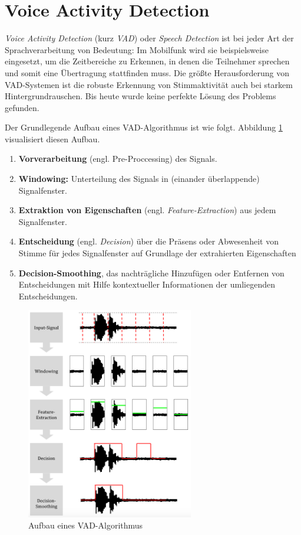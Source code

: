 \section{Voice Activity Detection}
\label{sec:vad_new}

\emph{Voice Activity Detection} (kurz \emph{VAD}) oder \emph{Speech Detection} ist bei jeder Art der Sprachverarbeitung von Bedeutung: Im Mobilfunk wird sie beispielsweise eingesetzt, um die Zeitbereiche zu Erkennen, in denen die Teilnehmer sprechen und somit eine Übertragung stattfinden muss. Die größte Herausforderung von VAD-Systemen ist die robuste Erkennung von Stimmaktivität auch bei starkem Hintergrundrauschen. Bis heute wurde keine \glqq perfekte Lösung\grqq{} des Problems gefunden. \cite[S. 1]{vad_granada} \cite[S. 1]{vad_kola} \cite[S. 1]{vad_Lisboa}

Der Grundlegende Aufbau eines VAD-Algorithmus ist wie folgt. Abbildung \ref{img:vad_pipeline} visualisiert diesen Aufbau.
\begin{enumerate}
	\item \textbf{Vorverarbeitung} (engl. Pre-Proccessing) des Signals.
	\item \textbf{Windowing: } Unterteilung des Signals in (einander überlappende) Signalfenster.
	\item \textbf{Extraktion von Eigenschaften} (engl. \emph{Feature-Extraction}) aus jedem Signalfenster.
	\item \textbf{Entscheidung} (engl. \emph{Decision}) über die Präsens oder Abwesenheit von Stimme für jedes Signalfenster auf Grundlage der extrahierten Eigenschaften
	\item \textbf{Decision-Smoothing}, das nachträgliche Hinzufügen oder Entfernen von Entscheidungen mit Hilfe kontextueller Informationen der umliegenden Entscheidungen.\cite[S. 8 - 9]{vad_granada} \cite[S. 1 - 2]{vad_kola}
\end{enumerate}

\begin{figure}[h]
	\centering
	\includegraphics[width=0.65\textwidth]{bilder/vad_pipeline03.png}
	\caption{Aufbau eines VAD-Algorithmus}
	\label{img:vad_pipeline}
\end{figure}


